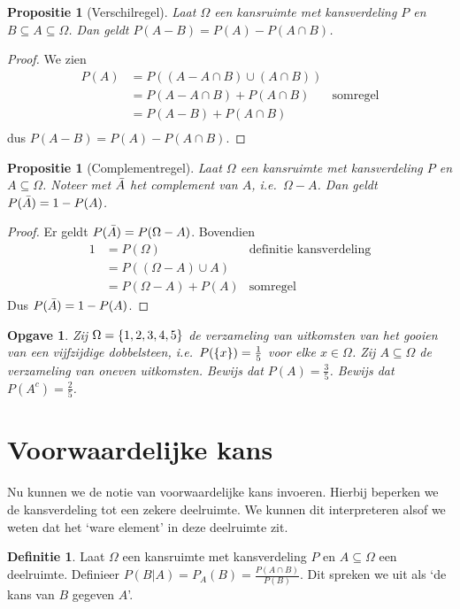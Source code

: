 \documentclass[a4paper]{book}
\newtheorem{proposition}[theorem]{Propositie}
\newtheorem{exercise}[theorem]{Opgave}
\theoremstyle{definition}
\newtheorem{definition}[theorem]{Definitie}
\begin{document}
\begin{proposition}[Verschilregel]\label{verschilregel}
    Laat $\Omega$ een kansruimte met kansverdeling $P$ en $B \subseteq A \subseteq \Omega$.
    Dan geldt $P(A - B) = P(A) - P(A \cap B) $.
\end{proposition}
\begin{proof}
    We zien
    \begin{align*}
        P(A)    &= P( (A - A \cap B) \cup (A \cap B) ) \\
                &= P(A - A \cap B ) + P(A \cap B) & \text{somregel} \\
                &= P(A - B) + P(A \cap B) \\
    \end{align*}
    dus $P(A - B) = P(A) - P(A \cap B) $.
\end{proof}

\begin{proposition}[Complementregel]\label{complementregel}
    Laat $\Omega$ een kansruimte met kansverdeling $P$ en $A \subseteq \Omega$.
    Noteer met $\compl{A}$ het complement van $A$, i.e.\ $\Omega - A$.
    Dan geldt $P(\compl{A}) = 1 - P(A)$.
\end{proposition}
\begin{proof}
    Er geldt $P(\compl{A}) = P(\Omega - A)$.
    Bovendien
    \begin{align*}
        1 &= P(\Omega) & \text{definitie kansverdeling}\\
          &= P( (\Omega - A) \cup A) \\
          &= P(\Omega - A) + P(A) & \text{somregel}
    \end{align*}
    Dus $P(\compl{A}) = 1 - P(A)$.
\end{proof}


\begin{exercise}
    Zij $\Omega = \set{1,2,3,4,5}$ de verzameling van uitkomsten van het gooien van een vijfzijdige dobbelsteen,
    i.e.\ $P(\set{x}) = \frac{1}{5}$ voor elke $x \in \Omega$.
    Zij $A \subseteq \Omega$ de verzameling van oneven uitkomsten.
    Bewijs dat $P(A) = \frac{3}{5}$.
    Bewijs dat $P(A^c) = \frac{2}{5}$.
\end{exercise}


\section{Voorwaardelijke kans}
Nu kunnen we de notie van voorwaardelijke kans invoeren.
Hierbij beperken we de kansverdeling tot een zekere deelruimte.
We kunnen dit interpreteren alsof we weten dat het `ware element' in deze deelruimte zit.
\begin{definition}
    Laat $\Omega$ een kansruimte met kansverdeling $P$ en $A \subseteq \Omega$ een deelruimte.
    Definieer $P(B|A) = P_A(B) = \frac{P(A \cap B)}{P(B)}$. Dit spreken we uit als `de kans van $B$ gegeven $A$'.
\end{definition}
\end{document}
